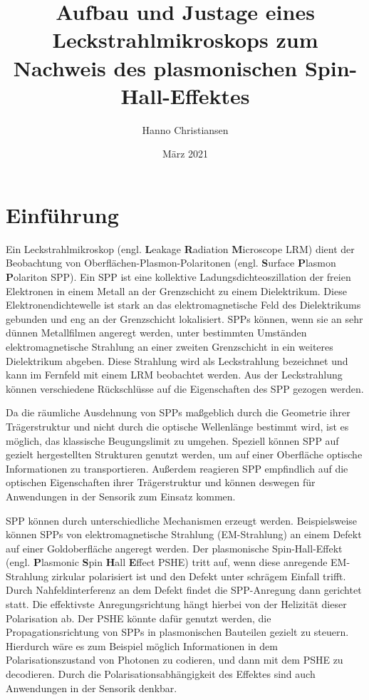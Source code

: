 \documentclass[titlepage,  ngerman]{article}
\title{Aufbau und Justage eines Leckstrahlmikroskops zum Nachweis des plasmonischen Spin-Hall-Effektes}
\author{Hanno Christiansen}
\date{März 2021}
\begin{document}
	\sloppy
	
	
	\tableofcontents
	\newpage
	\listoffigures 
	\newpage
	
	\section{Einführung}
	Ein Leckstrahlmikroskop (engl. \textbf{L}eakage \textbf{R}adiation \textbf{M}icroscope LRM) dient der Beobachtung von Oberflächen-Plasmon-Polaritonen (engl. \textbf{S}urface \textbf{P}lasmon \textbf{P}olariton SPP). Ein SPP ist eine kollektive Ladungsdichteoszillation der freien Elektronen in einem Metall an der Grenzschicht zu einem Dielektrikum. Diese Elektronendichtewelle ist stark an das elektromagnetische Feld des Dielektrikums gebunden und eng an der Grenzschicht lokalisiert. SPPs können, wenn sie an sehr dünnen Metallfilmen angeregt werden, unter bestimmten Umständen elektromagnetische Strahlung an einer zweiten Grenzschicht in ein weiteres Dielektrikum abgeben. Diese Strahlung wird als Leckstrahlung bezeichnet und kann im Fernfeld mit einem LRM beobachtet werden. Aus der Leckstrahlung können verschiedene Rückschlüsse auf die Eigenschaften des SPP gezogen werden.\cite{Drezet.2008}
	
	Da die räumliche Ausdehnung von SPPs maßgeblich durch die Geometrie ihrer Trägerstruktur und nicht durch die optische Wellenlänge bestimmt wird, ist es möglich, das klassische Beugungslimit zu umgehen. Speziell können SPP auf gezielt hergestellten Strukturen genutzt werden, um auf einer Oberfläche optische Informationen zu transportieren. Außerdem reagieren SPP empfindlich auf die optischen Eigenschaften ihrer Trägerstruktur und können deswegen für Anwendungen in der Sensorik zum Einsatz kommen.\cite{Lin.2013}
	
	SPP können durch unterschiedliche Mechanismen erzeugt werden. Beispielsweise können SPPs von elektromagnetische Strahlung (EM-Strahlung) an einem Defekt auf einer Goldoberfläche angeregt werden. Der plasmonische Spin-Hall-Effekt (engl. \textbf{P}lasmonic \textbf{S}pin \textbf{H}all \textbf{E}ffect PSHE) tritt auf, wenn diese anregende EM-Strahlung zirkular polarisiert ist und den Defekt unter schrägem Einfall trifft. Durch Nahfeldinterferenz an dem Defekt findet die SPP-Anregung dann gerichtet statt. Die effektivste Anregungsrichtung hängt hierbei von der Helizität dieser Polarisation ab. Der PSHE könnte dafür genutzt werden, die Propagationsrichtung von SPPs in plasmonischen Bauteilen gezielt zu steuern. Hierdurch wäre es zum Beispiel möglich Informationen in dem Polarisationszustand von Photonen zu codieren, und dann mit dem PSHE zu decodieren. Durch die Polarisationsabhängigkeit des Effektes sind auch Anwendungen in der Sensorik denkbar.\cite{RodriguezFortuno.2013}
	
\end{document}
